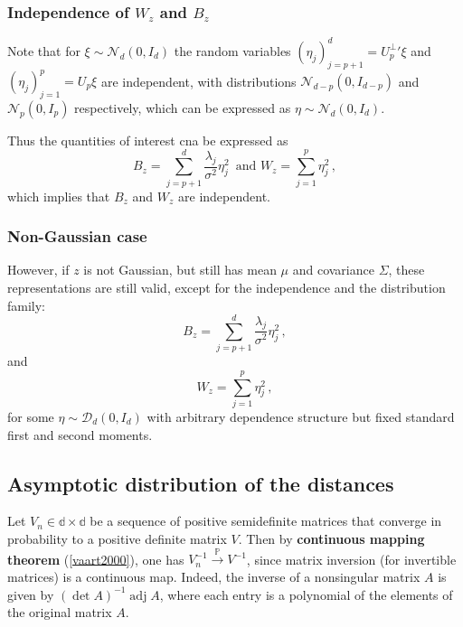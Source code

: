 \documentclass[a4paper,14pt]{article}
\newcommand{\pr}{\mathop{\mathbb{P}}\nolimits}
\newcommand{\prto}{\overset{\pr}{\to}}
\begin{document}

\subsubsection{Independence of $W_z$ and $B_z$} %
\label{ssub:independence_of_w_z_and_b_z}

Note that for $\xi \sim \mathcal{N}_d(0, I_d)$ the random variables $(\eta_j)_{j=p+1}^d = {U_p^\perp}'\xi$
and $(\eta_j)_{j=1}^p = U_p\xi$ are independent, with distributions $\mathcal{N}_{d-p}(0, I_{d-p})$
and $\mathcal{N}_p(0, I_p)$ respectively, which can be expressed as $\eta\sim \mathcal{N}_d(0, I_d)$.

Thus the quantities of interest cna be expressed as
$$ B_z = \sum_{j=p+1}^d \frac{\lambda_j}{\sigma^2} \eta_j^2\,
    \text{ and }
   W_z = \sum_{j=1}^p \eta_j^2\,,$$
which implies that $B_z$ and $W_z$ are independent.


\subsubsection{Non-Gaussian case} %
\label{ssub:non_gaussian_case}

However, if $z$ is not Gaussian, but still has mean $\mu$ and covariance $\Sigma$,
these representations are still valid, except for the independence and the distribution
family:
$$B_z = \sum_{j=p+1}^d \frac{\lambda_j}{\sigma^2} \eta_j^2\,,$$
and
$$W_z = \sum_{j=1}^p \eta_j^2\,,$$
for some $\eta \sim \mathcal{D}_d(0, I_d)$ with arbitrary dependence structure but fixed
standard first and second moments.


\subsection{Asymptotic distribution of the distances} %
\label{sub:asymptotic_distribution_of_the_distances}

Let $V_n\in\mathbb{d\times d}$ be a sequence of positive semidefinite matrices that
converge in probability to a positive definite matrix $V$. Then by \textbf{continuous
mapping theorem} (\ref{vaart2000}), one has $V_n^{-1} \prto V^{-1}$, since matrix
inversion (for invertible matrices) is a continuous map. Indeed, the inverse of
a nonsingular matrix $A$ is given by $(\mathop{\text{det}}A)^{-1}\mathop{\text{adj}}A$,
where each entry is a polynomial of the elements of the original matrix $A$.
\end{document}
